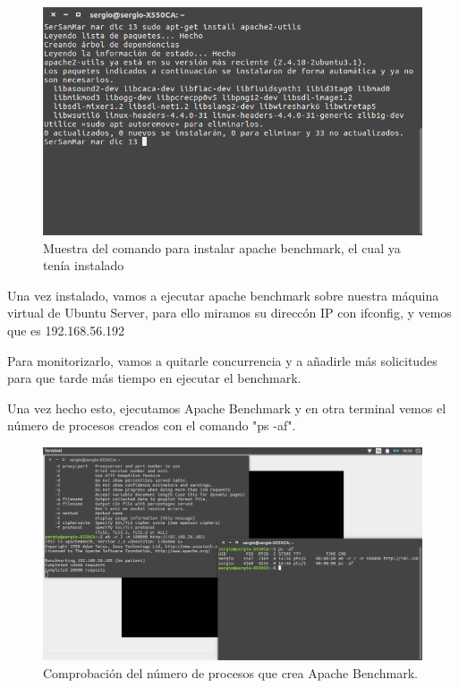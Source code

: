 \begin{figure}[H] %
	\centering
	\includegraphics[scale=0.5]{imagenes/instalo-ab.png}  %
	\caption{Muestra del comando para instalar apache benchmark, el cual ya tenía instalado}
\end{figure}

Una vez instalado, vamos a ejecutar apache benchmark sobre nuestra máquina virtual de Ubuntu Server, para ello miramos su direccón IP con ifconfig, y vemos que es 192.168.56.192

Para monitorizarlo, vamos a quitarle concurrencia y a añadirle más solicitudes para que tarde más tiempo en ejecutar el benchmark.

Una vez hecho esto, ejecutamos Apache Benchmark y en otra terminal vemos el número de procesos creados con el comando "ps -af".

\begin{figure}[H] %
	\centering
	\includegraphics[scale=0.35]{imagenes/monitor-ab.png}  %
	\caption{Comprobación del número de procesos que crea Apache Benchmark.}
\end{figure}

